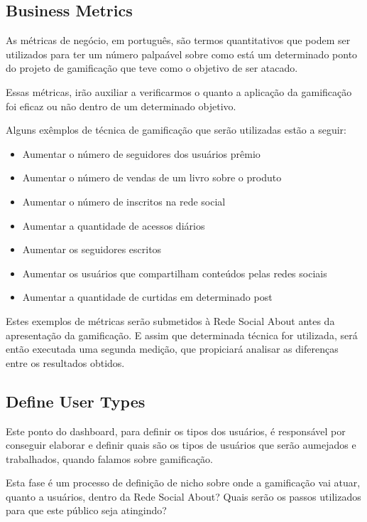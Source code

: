 \subsection{Business Metrics}
\label{sub:business_metrics}
As métricas de negócio, em português, são termos quantitativos que podem ser utilizados
para ter um número palpaável sobre como está um determinado ponto do projeto de gamificação
que teve como o objetivo de ser atacado.

Essas métricas, irão auxiliar a verificarmos o quanto a aplicação da gamificação foi eficaz ou
não dentro de um determinado objetivo.

Alguns exêmplos de técnica de gamificação que serão utilizadas estão a seguir:

\begin{itemize}
    \item Aumentar o número de seguidores dos usuários prêmio
    \item Aumentar o número de vendas de um livro sobre o produto
    \item Aumentar o número de inscritos na rede social
    \item Aumentar a quantidade de acessos diários
    \item Aumentar os seguidores escritos
    \item Aumentar os usuários que compartilham conteúdos pelas redes sociais
    \item Aumentar a quantidade de curtidas em determinado post
\end{itemize}

Estes exemplos de métricas serão submetidos à Rede Social About antes da apresentação da
gamificação. E assim que determinada técnica for utilizada, será então executada uma
segunda medição, que propiciará analisar as diferenças entre os resultados obtidos.

\subsection{Define User Types}
\label{sub:define_user_types}
Este ponto do dashboard, para definir os tipos dos usuários, é responsável por conseguir
elaborar e definir quais são os tipos de usuários que serão aumejados e trabalhados, quando
falamos sobre gamificação.

Esta fase é um processo de definição de nicho sobre onde a gamificação vai atuar, quanto a
usuários, dentro da Rede Social About? Quais serão os passos utilizados para que este público
seja atingindo?

